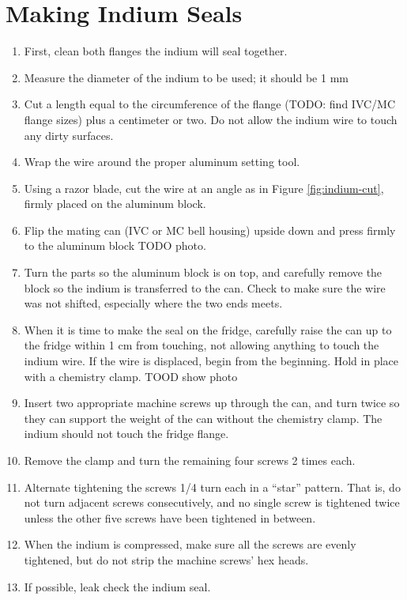 \section{Making Indium Seals}


\begin{enumerate}
 \item First, clean both flanges the indium will seal together.
 \item Measure the diameter of the indium to be used; it should be 1 mm
 \item Cut a length equal to the circumference of the flange (TODO: find IVC/MC flange sizes) plus a centimeter or two.  Do not allow the indium wire to touch any dirty surfaces.
 \item Wrap the wire around the proper aluminum setting tool.
 \item Using a razor blade, cut the wire at an angle as in Figure \ref{fig:indium-cut}, firmly placed on the aluminum block.
 \item Flip the mating can (IVC or MC bell housing) upside down and press firmly to the aluminum block TODO photo.
 \item Turn the parts so the aluminum block is on top, and carefully remove the block so the indium is transferred to the can.  Check to make sure the wire was not shifted, especially where the two ends meets.
 \item When it is time to make the seal on the fridge, carefully raise the can up to the fridge within 1 cm from touching, not allowing anything to touch the indium wire.  If the wire is displaced, begin from the beginning.  Hold in place with a chemistry clamp. TOOD show photo
 \item Insert two appropriate machine screws up through the can, and turn twice so they can support the weight of the can without the chemistry clamp.  The indium should not touch the fridge flange.
 \item Remove the clamp and turn the remaining four screws 2 times each.
 \item Alternate tightening the screws 1/4 turn each in a ``star'' pattern.  That is, do not turn adjacent screws consecutively, and no single screw is tightened twice unless the other five screws have been tightened in between.
 \item When the indium is compressed, make sure all the screws are evenly tightened, but do not strip the machine screws' hex heads.
 \item If possible, leak check the indium seal.
\end{enumerate}

